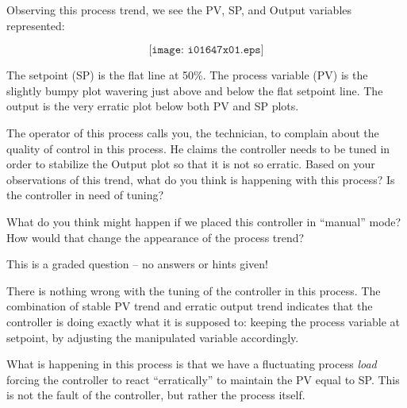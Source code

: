 

Observing this process trend, we see the PV, SP, and Output variables represented:

$$\texttt{[image: i01647x01.eps]}$$

The setpoint (SP) is the flat line at 50\%.  The process variable (PV) is the slightly bumpy plot wavering just above and below the flat setpoint line.  The output is the very erratic plot below both PV and SP plots.

The operator of this process calls you, the technician, to complain about the quality of control in this process.  He claims the controller needs to be tuned in order to stabilize the Output plot so that it is not so erratic.  Based on your observations of this trend, what do you think is happening with this process?  Is the controller in need of tuning?
 
\vskip 10pt

What do you think might happen if we placed this controller in ``manual'' mode?  How would that change the appearance of the process trend?

\vfil 

\eject






This is a graded question -- no answers or hints given!







There is nothing wrong with the tuning of the controller in this process.  The combination of stable PV trend and erratic output trend indicates that the controller is doing exactly what it is supposed to: keeping the process variable at setpoint, by adjusting the manipulated variable accordingly.

What is happening in this process is that we have a fluctuating process {\it load} forcing the controller to react ``erratically'' to maintain the PV equal to SP.  This is not the fault of the controller, but rather the process itself.

\vskip 10pt

